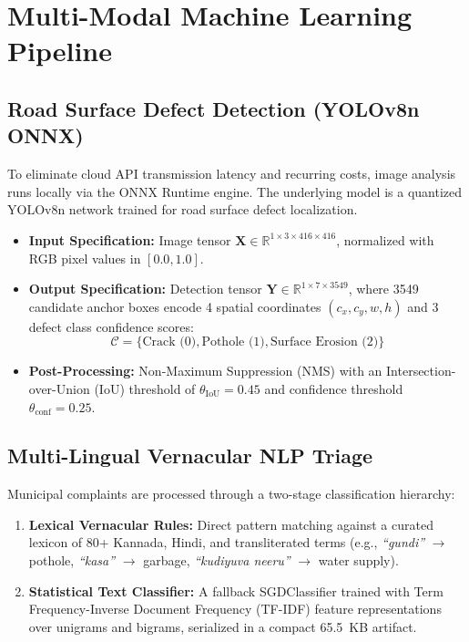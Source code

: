 \documentclass[conference]{IEEEtran}
\begin{document}
\section{Multi-Modal Machine Learning Pipeline}
\label{sec:ml}

\subsection{Road Surface Defect Detection (YOLOv8n ONNX)}
To eliminate cloud API transmission latency and recurring costs, image analysis runs locally via the ONNX Runtime engine. The underlying model is a quantized YOLOv8n network trained for road surface defect localization.
\begin{itemize}
    \item \textbf{Input Specification:} Image tensor $\mathbf{X} \in \mathbb{R}^{1 \times 3 \times 416 \times 416}$, normalized with RGB pixel values in $[0.0, 1.0]$.
    \item \textbf{Output Specification:} Detection tensor $\mathbf{Y} \in \mathbb{R}^{1 \times 7 \times 3549}$, where 3549 candidate anchor boxes encode 4 spatial coordinates $(c_x, c_y, w, h)$ and 3 defect class confidence scores:
    \begin{equation}
        \mathcal{C} = \{\text{Crack (0)}, \text{Pothole (1)}, \text{Surface Erosion (2)}\}
    \end{equation}
    \item \textbf{Post-Processing:} Non-Maximum Suppression (NMS) with an Intersection-over-Union (IoU) threshold of $\theta_{\text{IoU}} = 0.45$ and confidence threshold $\theta_{\text{conf}} = 0.25$.
\end{itemize}

\subsection{Multi-Lingual Vernacular NLP Triage}
Municipal complaints are processed through a two-stage classification hierarchy:
\begin{enumerate}
    \item \textbf{Lexical Vernacular Rules:} Direct pattern matching against a curated lexicon of 80+ Kannada, Hindi, and transliterated terms (e.g., \textit{``gundi''} $\rightarrow$ pothole, \textit{``kasa''} $\rightarrow$ garbage, \textit{``kudiyuva neeru''} $\rightarrow$ water supply).
    \item \textbf{Statistical Text Classifier:} A fallback SGDClassifier trained with Term Frequency-Inverse Document Frequency (TF-IDF) feature representations over unigrams and bigrams, serialized in a compact 65.5~KB artifact.
\end{enumerate}
\end{document}
